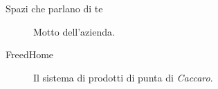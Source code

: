 \begin{description}
\item [Spazi che parlano di te] Motto dell'azienda.
\item [FreedHome] Il sistema di prodotti di punta di \textit{Caccaro}.
\end{description}